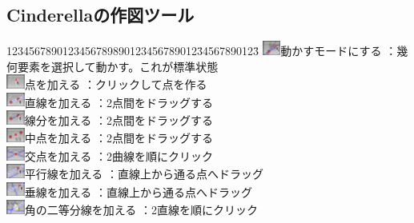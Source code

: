 \documentclass[papersize,a4paper,12pt,uplatex]{jsarticle}
\begin{document}
\subsection{Cinderellaの作図ツール}
 \begin{tabbing}
1234567890123456789890123456789012\=34567890123\=\kill
\includegraphics[bb=0 0 6.48 5.04 , width=0.6cm]{Fig/move.pdf}動かすモードにする \>：幾何要素を選択して動かす。これが標準状態\\
\includegraphics[bb=0 0 6.48 5.04 , width=0.6cm]{Fig/single-add.pdf}点を加える \>：クリックして点を作る\\
\includegraphics[bb=0 0 6.48 5.04 , width=0.6cm]{Fig/multi-add-line.pdf}直線を加える \>：2点間をドラッグする\\
\includegraphics[bb=0 0 6.48 5.04 , width=0.6cm]{Fig/segment.pdf}線分を加える \>：2点間をドラッグする\\
\includegraphics[bb=0 0 6.48 5.04 , width=0.6cm]{Fig/middle.pdf}中点を加える \>：2点間をドラッグする\\
\includegraphics[bb=0 0 6.48 5.04 , width=0.6cm]{Fig/intersection.pdf}交点を加える \>：2曲線を順にクリック\\
\includegraphics[bb=0 0 6.48 5.04 , width=0.6cm]{Fig/multi-add-parallel.pdf}平行線を加える \>：直線上から通る点へドラッグ\\
\includegraphics[bb=0 0 6.48 5.04 , width=0.6cm]{Fig/multi-add-perp.pdf}垂線を加える \>：直線上から通る点へドラッグ\\
\includegraphics[bb=0 0 6.48 5.04 , width=0.6cm]{Fig/bisector.pdf}角の二等分線を加える \>：2直線を順にクリック\\

\end{tabbing}
\end{document}
